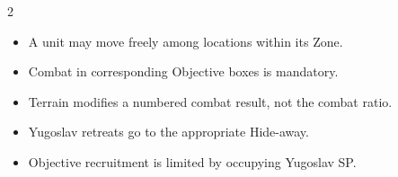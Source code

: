 \begin{multicols}{2}
\begin{itemize}[leftmargin=1.2em,itemsep=2pt]
  \item A unit may move freely among locations within its Zone.
  \item Combat in corresponding Objective boxes is mandatory.
  \item Terrain modifies a numbered combat result, not the combat ratio.
  \item Yugoslav retreats go to the appropriate Hide-away.
  \item Objective recruitment is limited by occupying Yugoslav SP.
\end{itemize}
\end{multicols}

